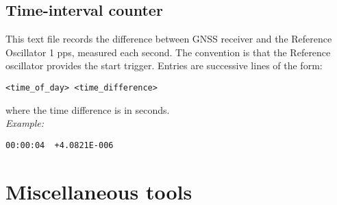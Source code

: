 \subsection{Time-interval counter \label{s:TICformat}}

This text file records the difference between GNSS receiver and the Reference Oscillator 1 pps,
measured each second. The convention is that the Reference oscillator provides the start trigger.
Entries are successive lines of the form:
\begin{lstlisting}
<time_of_day> <time_difference>
\end{lstlisting}
where the time difference is in seconds.\\
\textit{Example:}
\begin{lstlisting}
00:00:04  +4.0821E-006 
\end{lstlisting}






























\section{Miscellaneous tools}














